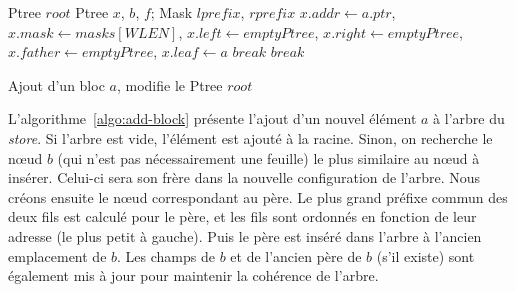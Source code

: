 \begin{algorithm}[h!]
\begin{algorithmic}[1]
\Statex Ptree $root$
\Statex
{}
\Statex Ptree $x$, $b$, $f$; Mask $lprefix$, $rprefix$
\State $x.addr \gets a.ptr$, $x.mask \gets masks[WLEN]$, $x.left \gets emptyPtree$,
\State $x.right \gets emptyPtree$, $x.father \gets emptyPtree$, $x.leaf \gets a$
\Else
      \State $\mathit{break}$
    \EndIf
    \Else
      \State $\mathit{break}$
    \EndIf
  \EndWhile
  \Else
    \Else
    \EndIf
  \EndIf
  \EndIf
\EndIf
\EndProcedure
\end{algorithmic}
\caption{Ajout d'un bloc $a$, modifie le Ptree $root$
  \label{algo:add-block}}
\end{algorithm}

L'algorithme~\ref{algo:add-block} présente l'ajout d'un nouvel élément $a$ à
l'arbre du {\em store}.
Si l'arbre est vide, l'élément est ajouté à la racine.
Sinon, on recherche le n\oe{}ud $b$ (qui n'est pas nécessairement une feuille)
le plus similaire au n\oe{}ud à insérer.
Celui-ci sera son frère dans la nouvelle configuration de l'arbre.
Nous créons ensuite le n\oe{}ud correspondant au père.
Le plus grand préfixe commun des deux fils est calculé pour le père, et les fils
sont ordonnés en fonction de leur adresse (le plus petit à gauche).
Puis le père est inséré dans l'arbre à l'ancien emplacement de $b$.
Les champs de $b$ et de l'ancien père de $b$ (s'il existe) sont également mis à
jour pour maintenir la cohérence de l'arbre.



